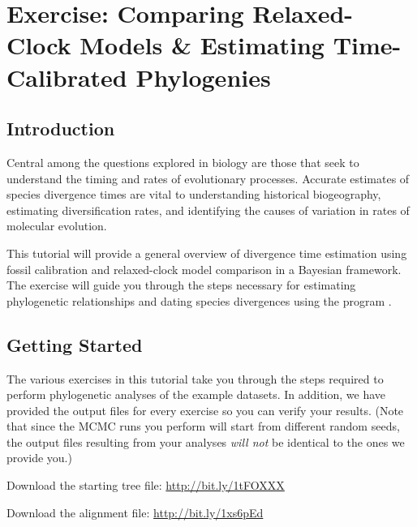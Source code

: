 \section{Exercise: Comparing Relaxed-Clock Models \& Estimating Time-Calibrated Phylogenies}

\subsection{Introduction}

Central among the questions explored in biology are those that seek to understand the timing and rates of evolutionary processes. Accurate estimates of species divergence times are vital to understanding historical biogeography, estimating diversification rates, and identifying the causes of variation in rates of molecular evolution. 

This tutorial will provide a general overview of divergence time estimation using fossil calibration and relaxed-clock model comparison in a Bayesian framework. The exercise will guide you through the steps necessary for estimating phylogenetic relationships and dating species divergences using the program \href{https://github.com/revbayes/revbayes}{\RevBayes}. 

%

\bigskip
\subsection{Getting Started}\label{gettingStarted}


The various exercises in this tutorial take you through the steps required to perform phylogenetic analyses of the example datasets. 
In addition, we have provided the output files for every exercise so you can verify your results. (Note that since the MCMC runs you perform will start from different random seeds, the output files resulting from your analyses \textit{will not} be identical to the ones we provide you.)

\begin{framed}
Download the starting tree file: \href{http://bit.ly/1tFOXXX}{http://bit.ly/1tFOXXX}

Download the alignment file: \href{http://bit.ly/1xs6pEd}{http://bit.ly/1xs6pEd}
\end{framed}


